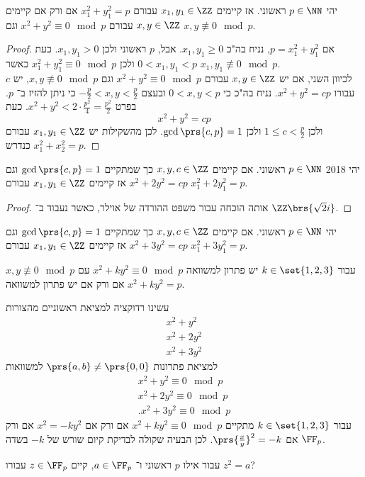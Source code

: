 \documentclass[a4paper,10pt,twoside,openany]{book}
\begin{document}
\begin{corollary}
יהי
$p \in \NN$
ראשוני. אז קיימים
$x_1,y_1 \in \ZZ$
עבורם
$x_1^2 + y_1^2 = p$
אם ורק אם קיימים
$x,y \in \ZZ$
עבורם
$x^2 + y^2 \equiv 0 \mod{p}$
וגם
$x,y \not\equiv 0 \mod{p}$.
\end{corollary}
\begin{proof}
אם
$p = x_1^2 + y_1^2$,
נניח בה"כ
$x_1, y_1 \geq 0$.
אבל,
$p$
ראשוני ולכן
$x_1, y_1 > 0$.
כעת
$0 < x_1,y_1 < p$
ולכן
$x_1^2 + y_1^2 \equiv 0 \mod{p}$
כאשר
$x_1,y_1 \not\equiv 0 \mod{p}$.\\
לכיוון השני, אם יש
$x,y \in \ZZ$
עבורם
$x^2 + y^2 \equiv 0 \mod{p}$
וגם
$x,y \not\equiv 0 \mod{p}$,
יש
$c$
עבורו
$x^2 + y^2 = cp$.
נניח בה"כ כי
$0<x,y<p$
ובעצם
$-\frac{p}{2} < x,y < \frac{p}{2}$
כי ניתן להזיז ב־%
$p$.
בפרט
$x^2 + y^2 < 2 \cdot \frac{p^2}{4} = \frac{p^2}{2}$.
כעת
\[x^2 + y^2 = cp\]
ולכן
$1 \leq c < \frac{p}{2}$
ולכן
$\gcd\prs{c,p} = 1$.
לכן מהשקילות יש
$x_1,y_1 \in \ZZ$
עבורם
$x_1^2 + x_2^2 = p$
כנדרש.
\end{proof}
\begin{theorem}[אוילר]
יהי%
%
{2018}
$p \in \NN$
ראשוני.
אם קיימים
$x,y,c \in \ZZ$
כך שמתקיים
$\gcd\prs{c,p}=1$
וגם
$x^2 + 2y^2 = cp$
אז קיימים
$x_1,y_1 \in \ZZ$
עבורם
$x_1^2 + 2y_1^2 = p$.
\end{theorem}
\begin{proof}
אותה הוכחה עבור משפט ההורדה של אוילר, כאשר נעבוד ב־%
$\ZZ\brs{\sqrt{2}i}$.
\end{proof}
\begin{theorem}[אוילר]
יהי
$p \in \NN$
ראשוני.
אם קיימים
$x,y,c \in \ZZ$
כך שמתקיים
$\gcd\prs{c,p}=1$
וגם
$x^2 + 3y^2 = cp$
אז קיימים
$x_1,y_1 \in \ZZ$
עבורם
$x_1^2 + 3y_1^2 = p$.
\end{theorem}
\begin{corollary}
עבור
$k \in \set{1,2,3}$
יש פתרון למשוואה
$x^2 + ky^2 \equiv 0 \mod{p}$
עם
$x,y \not\equiv 0 \mod{p}$
אם ורק אם יש פתרון למשוואה
$x^2 + ky^2 = p$.
\end{corollary}

עשינו רדוקציה למציאת ראשוניים מהצורות
\begin{align*}
x^2 + y^2 \\
x^2 + 2y^2 \\
x^2 + 3y^2
\end{align*}
למציאת פתרונות
$\prs{a,b} \neq \prs{0,0}$
למשוואות
\begin{align*}
x^2 + y^2 \equiv 0 \mod{p} \\
x^2 + 2y^2 \equiv 0 \mod{p} \\
\text{.} x^2 + 3y^2 \equiv 0 \mod{p}
\end{align*}
עבור
$k \in \set{1,2,3}$
מתקיים
$x^2 + ky^2 \equiv 0 \mod{p}$
אם ורק אם
$x^2 = -ky^2$
אם ורק אם
$\prs{\frac{x}{y}}^2 = -k$.
לכן הבעיה שקולה לבדיקת קיום שורש של
$-k$
בשדה
$\FF_p$.
\begin{question}
עבור אילו
$p$
ראשוני ו־%
$a \in \FF_p$,
קיים
$z \in \FF_p$
עבורו
$z^2 = a$?
\end{question}
\end{document}
